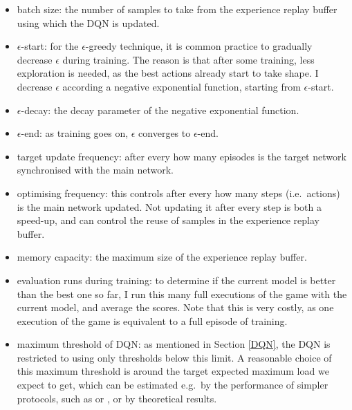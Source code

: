 \begin{itemize} 
    \item batch size: the number of samples to take from the experience replay buffer using which the DQN is updated.
    
    \item $\epsilon$-start: for the $\epsilon$-greedy technique, it is common practice to gradually decrease $\epsilon$ during training. The reason is that after some training, less exploration is needed, as the best actions already start to take shape. I decrease $\epsilon$ according a negative exponential function, starting from $\epsilon$-start.
    
    \item $\epsilon$-decay: the decay parameter of the negative exponential function.
    
    \item $\epsilon$-end: as training goes on, $\epsilon$ converges to $\epsilon$-end.
     
    
    \item target update frequency: after every how many episodes is the target network synchronised with the main network.
    
    \item optimising frequency: this controls after every how many steps (i.e.\ actions) is the main network updated. Not updating it after every step is both a speed-up, and can control the reuse of samples in the experience replay buffer.
    
    \item memory capacity: the maximum size of the experience replay buffer.
    
    \item evaluation runs during training: to determine if the current model is better than the best one so far, I run this many full executions of the game with the current model, and average the scores. Note that this is very costly, as one execution of the game is equivalent to a full episode of training.
    
    \item maximum threshold of DQN: as mentioned in Section \ref{DQN}, the DQN is restricted to using only thresholds below this limit. A reasonable choice of this maximum threshold is around the target expected maximum load we expect to get, which can be estimated e.g.\ by the performance of simpler protocols, such as \OneChoice or \TwoChoice, or by theoretical results.
    

\end{itemize}
